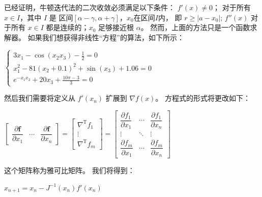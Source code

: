 \documentclass[12pt, a4paper, oneside]{ctexart}
\begin{document}
\begin{spacing}{2.0}
已经证明，牛顿迭代法的二次收敛必须满足以下条件：
$f'(x)\ne 0$； 对于所有 $x\in I$，其中 $I$ 是
区间$[\alpha - \gamma, \alpha + \gamma]$，$x_0$在区间$I$内，
即 $ r \geqslant \left| a-x_0 \right|$;
$f''(x)$ 对于所有 $x\in I$ 都是连续的；$x_0$ 足够接近根 $\alpha$。
然而，上面的方法只是一个函数求解器。 如果我们想获得非线性“方程”的算法，如下所示：
\begin{center}
    $    \begin{cases}
            3x_{1} - \cos{(x_{2}x_{3})} - \frac{1}{2} = 0 \\
            x_{1}^{2} - 81(x_{2} + 0.1)^{2} + \sin(x_{3}) + 1.06 = 0 \\
            e^{-x_{1}x_{2}} + 20x_{3} + \frac{10\pi - 3}{3} = 0
        \end{cases} $       
\end{center}

然后我们需要将定义从 $f'(x_n)$ 扩展到 $\nabla f(x)$。 方程式的形式将更改如下\cite{enwiki:1141352419}：
\begin{center}
    $\begin{bmatrix}
        \dfrac{\partial \mathbf{f}}{\partial x_1} & \cdots & \dfrac{\partial \mathbf{f}}{\partial x_n}
      \end{bmatrix}
      = \begin{bmatrix}
        \nabla^{\mathrm T} f_1 \\  
        \vdots \\
        \nabla^{\mathrm T} f_m   
      \end{bmatrix}
      = \begin{bmatrix}
          \dfrac{\partial f_1}{\partial x_1} & \cdots & \dfrac{\partial f_1}{\partial x_n}\\
          \vdots                             & \ddots & \vdots\\
          \dfrac{\partial f_m}{\partial x_1} & \cdots & \dfrac{\partial f_m}{\partial x_n}
      \end{bmatrix}$
\end{center}
这个矩阵称为雅可比矩阵。 我们将得到：
\begin{center}
    $x_{n+1} = x_n - J^{-1}(x_n)f'(x_n)$
\end{center}

\end{spacing}
\end{document}
